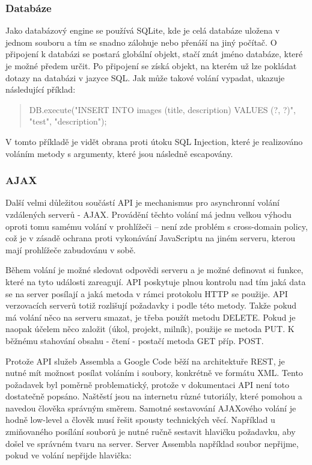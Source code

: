 \subsubsection{Databáze}

Jako databázový engine se používá SQLite\cite{sqlite}, kde je celá databáze uložena v jednom souboru a tím se snadno zálohuje nebo přenáší na jiný počítač. O připojení k databázi se postará globální objekt, stačí znát jméno databáze, které je možné předem určit. Po připojení se získá objekt, na kterém už lze pokládat dotazy na databázi v jazyce SQL. Jak může takové volání vypadat, ukazuje následující příklad:

\begin{quote}
DB.execute("INSERT INTO images (title, description) VALUES (?, ?)", "test", "description");
\end{quote}

V tomto příkladě je vidět obrana proti útoku SQL Injection, které je realizováno voláním metody s argumenty, které jsou následně escapovány.

\subsubsection{AJAX}

Další velmi důležitou součástí API je mechanismus pro asynchronní volání vzdálených serverů - AJAX. Provádění těchto volání má jednu velkou výhodu oproti tomu samému volání v prohlížeči – není zde problém s cross-domain policy\cite{sameorigin}, což je v zásadě ochrana proti vykonávání JavaScriptu na jiném serveru, kterou mají prohlížeče zabudovánu v sobě. 

Během volání je možné sledovat odpovědi serveru a je možné definovat si funkce, které na tyto události zareagují. API poskytuje plnou kontrolu nad tím jaká data se na server posílají a jaká metoda v rámci protokolu HTTP se použije. API verzovacích serverů totiž rozlišují požadavky i podle této metody. Takže pokud má volání něco na serveru smazat, je třeba použít metodu DELETE. Pokud je naopak účelem něco založit (úkol, projekt, milník), použije se metoda PUT. K běžnému stahování obsahu - čtení - postačí metoda GET příp. POST.

Protože API služeb Assembla a Google Code běží na architektuře REST, je nutné mít možnost posílat voláním i soubory, konkrétně ve formátu XML. Tento požadavek byl poměrně problematický, protože v dokumentaci API není toto dostatečně popsáno. Naštěstí jsou na internetu různé tutoriály, které pomohou a navedou člověka správným směrem. Samotné sestavování AJAXového volání je hodně low-level a člověk musí řešit spousty technických věcí. Například u zmiňovaného posílání souborů je nutné ručně sestavit hlavičku požadavku, aby došel ve správném tvaru na server. Server Assembla například soubor nepřijme, pokud ve volání nepřijde hlavička:

